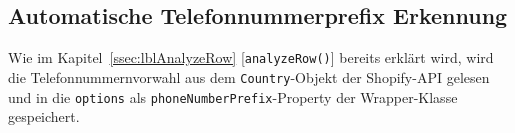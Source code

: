 \subsection{Automatische Telefonnummerprefix Erkennung}

Wie im Kapitel~\ref{ssec:lblAnalyzeRow} [\texttt{analyzeRow()}] bereits erklärt wird, wird die Telefonnummernvorwahl aus dem \texttt{Country}-Objekt der Shopify-API gelesen und in die \texttt{options} als \texttt{phoneNumberPrefix}-Property der Wrapper-Klasse gespeichert.